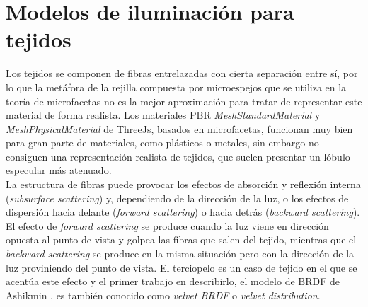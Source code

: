 \chapter{Modelos de iluminaci\'on para tejidos}
Los tejidos se componen de fibras entrelazadas con cierta separaci\'on entre s\'i, por lo que la met\'afora de la
rejilla compuesta por microespejos que se utiliza en la teor\'ia de microfacetas no es la mejor aproximaci\'on para tratar
de representar este material de forma realista. Los materiales PBR \textit{MeshStandardMaterial} y \textit{MeshPhysicalMaterial} de
ThreeJs, basados en microfacetas, funcionan muy bien para gran parte de materiales, como pl\'asticos o metales, sin embargo no consiguen
una representaci\'on realista de tejidos, que suelen presentar un l\'obulo especular m\'as atenuado.\\

La estructura de fibras puede provocar los efectos de absorci\'on y reflexi\'on interna (\textit{subsurface scattering}) y, dependiendo
de la direcci\'on de la luz, o los efectos de dispersi\'on hacia delante (\textit{forward scattering}) o hacia detr\'as (\textit{backward scattering}).
El efecto de \textit{forward scattering} se produce cuando la luz viene en direcci\'on opuesta al punto de vista y golpea las fibras que salen del tejido,
mientras que el \textit{backward scattering} se produce en la misma situaci\'on pero con la direcci\'on de la luz proviniendo del punto de vista. 
El terciopelo es un caso de tejido en el que se acent\'ua este efecto y el primer trabajo en describirlo, el modelo de BRDF de Ashikmin \autocite{ashikhmin}, es tambi\'en conocido como \textit{velvet BRDF} o
\textit{velvet distribution}.\\


